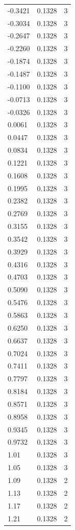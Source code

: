 \begin{longtable}{lrr}
  -0.3421 & 0.1328 & 3 \\
  -0.3034 & 0.1328 & 3 \\
  -0.2647 & 0.1328 & 3 \\
  -0.2260 & 0.1328 & 3 \\
  -0.1874 & 0.1328 & 3 \\
  -0.1487 & 0.1328 & 3 \\
  -0.1100 & 0.1328 & 3 \\
  -0.0713 & 0.1328 & 3 \\
  -0.0326 & 0.1328 & 3 \\
  0.0061 & 0.1328 & 3 \\
  0.0447 & 0.1328 & 3 \\
  0.0834 & 0.1328 & 3 \\
  0.1221 & 0.1328 & 3 \\
  0.1608 & 0.1328 & 3 \\
  0.1995 & 0.1328 & 3 \\
  0.2382 & 0.1328 & 3 \\
  0.2769 & 0.1328 & 3 \\
  0.3155 & 0.1328 & 3 \\
  0.3542 & 0.1328 & 3 \\
  0.3929 & 0.1328 & 3 \\
  0.4316 & 0.1328 & 3 \\
  0.4703 & 0.1328 & 3 \\
  0.5090 & 0.1328 & 3 \\
  0.5476 & 0.1328 & 3 \\
  0.5863 & 0.1328 & 3 \\
  0.6250 & 0.1328 & 3 \\
  0.6637 & 0.1328 & 3 \\
  0.7024 & 0.1328 & 3 \\
  0.7411 & 0.1328 & 3 \\
  0.7797 & 0.1328 & 3 \\
  0.8184 & 0.1328 & 3 \\
  0.8571 & 0.1328 & 3 \\
  0.8958 & 0.1328 & 3 \\
  0.9345 & 0.1328 & 3 \\
  0.9732 & 0.1328 & 3 \\
  1.01 & 0.1328 & 3 \\
  1.05 & 0.1328 & 3 \\
  1.09 & 0.1328 & 2 \\
  1.13 & 0.1328 & 2 \\
  1.17 & 0.1328 & 2 \\
  1.21 & 0.1328 & 2 \\

\end{longtable}
